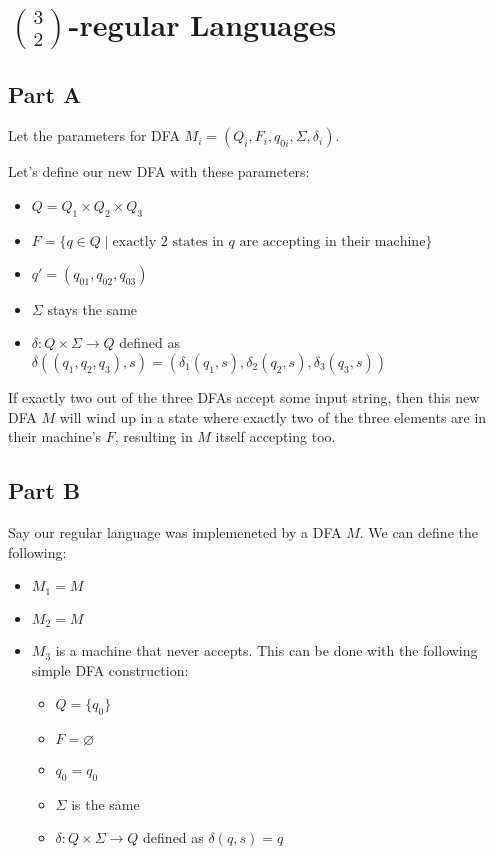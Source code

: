 \documentclass[12pt]{article}
\begin{document}
\section{$\binom{3}{2}$-regular Languages}

\subsection*{Part A}

Let the parameters for DFA $M_i=(Q_i, F_i, q_{0i}, \Sigma, \delta_i)$.

Let's define our new DFA with these parameters:
\begin{itemize}[nolistsep]
    \item $Q=Q_1 \times Q_2 \times Q_3$
    \item $F=\{q \in Q \mid \text{exactly 2 states in $q$ are accepting in their machine}\}$
    \item $q'=\left(q_{01}, q_{02}, q_{03}\right)$
    \item $\Sigma$ stays the same
    \item $\delta: Q \times \Sigma \rightarrow Q$ defined as
          $\delta((q_1, q_2, q_3), s)=(\delta_1(q_1, s), \delta_2(q_2, s), \delta_3(q_3, s))$
\end{itemize}

If exactly two out of the three DFAs accept some input string, then this
new DFA $M$ will wind up in a state where exactly two of the three elements
are in their machine's $F$, resulting in $M$ itself accepting too.

\subsection*{Part B}

Say our regular language was implemeneted by a DFA $M$.
We can define the following:
\begin{itemize}[nolistsep]
    \item $M_1=M$
    \item $M_2=M$
    \item $M_3$ is a machine that never accepts.
          This can be done with the following simple DFA construction:
          \begin{itemize}[nolistsep]
              \item $Q=\{q_0\}$
              \item $F=\varnothing$
              \item $q_0=q_0$
              \item $\Sigma$ is the same
              \item $\delta: Q \times \Sigma \rightarrow Q$ defined as $\delta(q, s)=q$
          \end{itemize}
\end{itemize}
\end{document}
